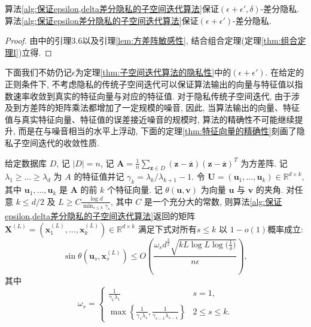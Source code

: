 \begin{thm}[子空间迭代算法的隐私性]\label{thm:子空间迭代算法的隐私性}
  算法\ref{alg:保证epsilon,delta差分隐私的子空间迭代算法}保证$(\epsilon + \epsilon', \delta)$-差分隐私. 算法\ref{alg:保证epsilon差分隐私的子空间迭代算法}保证$(\epsilon + \epsilon')$-差分隐私.
\end{thm}
\begin{proof}
  由\parencite{hardt2013robust}中的引理3.6以及引理\ref{lem:方差阵敏感性}, 结合组合定理(定理\ref{thm:组合定理I})立得.
\end{proof}
下面我们不妨仍记$\epsilon$为定理\ref{thm:子空间迭代算法的隐私性}中的$(\epsilon + \epsilon')$. 在给定的正则条件下, 不考虑隐私的传统子空间迭代可以保证算法输出的向量与特征值以指数速率收敛到真实的特征向量与对应的特征值\parencite{rutishauser1970simultaneous}. 对于隐私传统子空间迭代, 由于涉及到方差阵的矩阵乘法都增加了一定规模的噪音, 因此, 当算法输出的向量、特征值与真实特征向量、特征值的误差接近噪音的规模时, 算法的精确性不可能继续提升, 而是在与噪音相当的水平上浮动, 下面的定理\ref{thm:特征向量的精确性}刻画了隐私子空间迭代的收敛性质. 
\begin{thm}[特征向量的精确性]\label{thm:特征向量的精确性}
给定数据库 $D$, 记 $|D| = n$, 记 $\mathbf{A}=\frac{1}{n}\sum_{\mathbf{z}\in D} (\mathbf{z}-\overline{\mathbf{z}})(\mathbf{z}-\overline{\mathbf{z}})^T$ 为方差阵. 记 $\lambda_1\ge\dots\ge\lambda_d$ 为 $A$ 的特征值并记 $\gamma_k = \lambda_k/\lambda_{k+1} - 1$. 令 $\mathbf{U} = (\mathbf{u}_1, \dots, \mathbf{u}_k) \in \mathbb{R}^{d\times k}$, 其中 $\mathbf{u}_1,\ldots,\mathbf{u}_k$ 是 $\mathbf{A}$ 的前 $k$ 个特征向量. 记 $\theta(\mathbf{u}, \mathbf{v})$ 为向量 $\mathbf{u}$ 与 $\mathbf{v}$ 的夹角. 对任意 $k \le d/2$ 及 $L \ge C \frac{\log d}{\min_{s\le k}\gamma_s}$, 其中 $C$ 是一个充分大的常数, 则算法\ref{alg:保证epsilon,delta差分隐私的子空间迭代算法}返回的矩阵 $\mathbf{X}^{(L)} = \left(\mathbf{x}_1^{(L)}, \dots, \mathbf{x}_k^{(L)}\right) \in\mathbb{R}^{d\times k}$ 满足下式对所有$s \le k$ 以 $1 - o(1)$概率成立:
  	\begin{equation*}
  		\sin\theta(\mathbf{u}_s, \mathbf{x}_s^{(L)}) \le O\left(\frac{\omega_s d^{\frac{3}{2}}\sqrt{kL\log L\log\bigl(\frac{1}{\delta}\bigr)}}{n\epsilon}\right),
  	\end{equation*}
  	其中
  	\[
  		\omega_s = \begin{cases}
  			\frac{1}{\gamma_1\lambda_1} & s = 1,\\
  \max\left\{\frac{1}{\gamma_s\lambda_s}, \frac{1}{\gamma_{s-1}\lambda_{s-1}}\right\} & 2 \le s \le k.
  		\end{cases}
  	\]
\end{thm}
